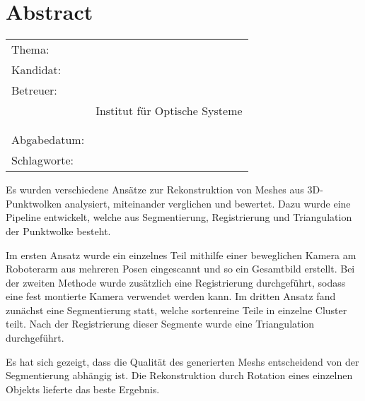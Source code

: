 \thispagestyle{plain}
\chapter*{Abstract}
\label{ch:abstract}


\begin{center}
	\begin{tabular}{p{3cm}p{10cm}}
		Thema: & \thema \\[1ex]
		Kandidat: & \autor \\[1ex]
		Betreuer: & \prueferA \\%
		 & Institut für Optische Systeme\\[1ex]
		 & \prueferB \\%
		 & \firma \\[1ex]
		Abgabedatum: & \abgabedatum \\[1ex]
		Schlagworte: & \schlagworte \\
	\end{tabular}
\end{center}


Es wurden verschiedene Ansätze zur Rekonstruktion von Meshes aus 3D-Punktwolken analysiert, miteinander verglichen und bewertet.
Dazu wurde eine Pipeline entwickelt, welche aus Segmentierung, Registrierung und Triangulation der Punktwolke besteht.

Im ersten Ansatz wurde ein einzelnes Teil mithilfe einer beweglichen Kamera am Roboterarm aus mehreren Posen eingescannt und so ein Gesamtbild erstellt.
Bei der zweiten Methode wurde zusätzlich eine Registrierung durchgeführt, sodass eine fest montierte Kamera verwendet werden kann.
Im dritten Ansatz fand zunächst eine Segmentierung statt, welche sortenreine Teile in einzelne Cluster teilt.
Nach der Registrierung dieser Segmente wurde eine Triangulation durchgeführt.

Es hat sich gezeigt, dass die Qualität des generierten Meshs entscheidend von der Segmentierung abhängig ist.
Die Rekonstruktion durch Rotation eines einzelnen Objekts lieferte das beste Ergebnis.


\newpage
